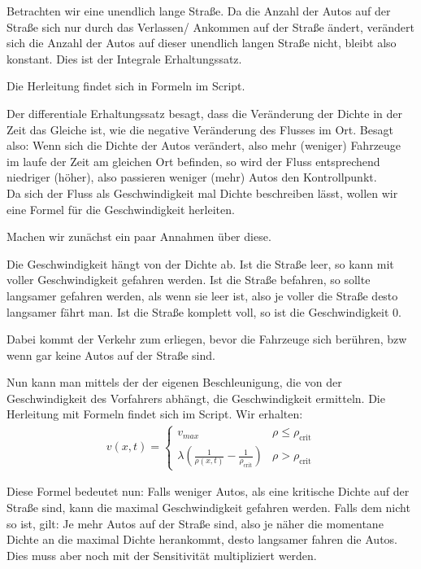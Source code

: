 \documentclass[]{article}
\begin{document}
Betrachten wir eine unendlich lange Straße. Da die Anzahl der Autos auf der Straße sich nur durch das Verlassen/ Ankommen auf der Straße ändert, verändert sich die Anzahl der Autos auf dieser unendlich langen Straße nicht, bleibt also konstant. Dies ist der Integrale Erhaltungssatz. 

Die Herleitung findet sich in Formeln im Script. 

Der differentiale Erhaltungssatz besagt, dass die Veränderung der Dichte in der Zeit das Gleiche ist, wie die negative Veränderung des Flusses im Ort. Besagt also: Wenn sich die Dichte der Autos verändert, also mehr (weniger) Fahrzeuge im laufe der Zeit am gleichen Ort befinden, so wird der Fluss entsprechend niedriger (höher), also passieren weniger (mehr) Autos den Kontrollpunkt. \\

Da sich der Fluss als Geschwindigkeit mal Dichte beschreiben lässt, wollen wir eine Formel für die Geschwindigkeit herleiten.

Machen wir zunächst ein paar Annahmen über diese.  

Die Geschwindigkeit hängt von der Dichte ab. Ist die Straße leer, so kann mit voller Geschwindigkeit gefahren werden. Ist die Straße befahren, so sollte langsamer gefahren werden, als wenn sie leer ist, also je voller die Straße desto langsamer fährt man. Ist die Straße komplett voll, so ist die Geschwindigkeit 0. 

Dabei kommt der Verkehr zum erliegen, bevor die Fahrzeuge sich berühren, bzw wenn gar keine Autos auf der Straße sind. 

Nun kann man mittels der der eigenen Beschleunigung, die von der Geschwindigkeit des Vorfahrers abhängt, die Geschwindigkeit ermitteln. Die Herleitung mit Formeln findet sich im Script. Wir erhalten: 
\begin{align*}
	v(x,t)= 
	\begin{cases}
		v_{max} & \rho \le \rho_{\text{crit}} \\
		\lambda \left(  \frac{1}{\rho(x,t)} - \frac{1}{\rho_{\text{crit}}}\right) & \rho> \rho_{\text{crit}}
	\end{cases}
\end{align*}

Diese Formel bedeutet nun: Falls weniger Autos, als eine kritische Dichte auf der Straße sind, kann die maximal Geschwindigkeit gefahren werden. 
Falls dem nicht so ist, gilt: Je mehr Autos auf der Straße sind, also je näher die momentane Dichte an die maximal Dichte herankommt, desto langsamer fahren die Autos. Dies muss aber noch mit der Sensitivität multipliziert werden. \\
\end{document}

